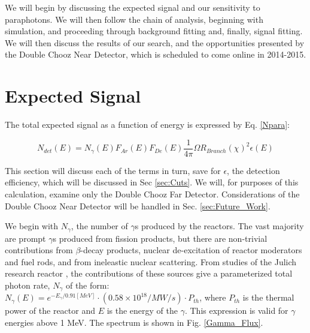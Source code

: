 We will begin by discussing the expected signal and our sensitivity to paraphotons. We will then follow the chain of analysis, beginning with simulation, and proceeding through background fitting and, finally, signal fitting. We will then discuss the results of our search, and the opportunities presented by the Double Chooz Near Detector, which is scheduled to come online in 2014-2015. 

\section{Expected Signal}
The total expected signal as a function of energy is expressed by Eq. \ref{Npara}: 

\begin{equation}
N_{det}(E) = N_{\gamma}(E) F_{Ar}(E) F_{De}(E)  \frac{1}{4 \pi}  \Omega R_{Branch} (\chi)^2 \epsilon(E)
\label{Npara}
\end{equation}

This section will discuss each of the terms in turn, save for $\epsilon $, the detection efficiency, which will be discussed in Sec \ref{sec:Cuts}.  We will, for purposes of this calculation, examine only the Double Chooz Far Detector. Considerations of the Double Chooz Near Detector will be handled in Sec. \ref{sec:Future_Work}.

We begin with $N_{\gamma}$, the number of $\gamma$s produced by the reactors. The vast majority are prompt $\gamma$s produced from fission products, but there are non-trivial contributions from $\beta$-decay products, nuclear de-excitation of reactor moderators and fuel rods, and from ineleastic nuclear scattering. From studies of the Julich research reactor \cite{Chris_Jones}, the contributions of these sources give a parameterized total photon rate, $N_{\gamma}$ of the form: $N_{\gamma}(E) = e^{-E_{\gamma}/0.91 [MeV]} \cdot (0.58 \times 10^{18} /MW /s) \cdot P_{th}  $, where $P_{th}$ is the thermal power of the reactor and $E$ is the energy of the $\gamma$. This expression is valid for $\gamma$ energies above 1 MeV. The spectrum is shown in Fig. \ref{Gamma_Flux}.

